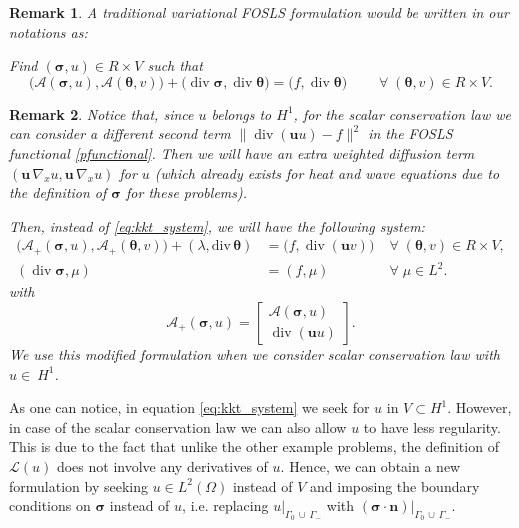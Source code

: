 \documentclass[a4paper,12pt]{amsart}
\numberwithin{equation}{section}
\newtheorem{remark}{Remark}[section]
\renewcommand{\div}{\operatorname{div}}
\def\bu{{\mathbf u}}
\def\bn{{\mathbf n}}
\newcommand{\A}{{\mathcal A}}
\def\btheta{{\boldsymbol \theta}}
\def\bsigma{{\boldsymbol \sigma}}
\newcommand{\om}{\Omega}
\begin{document}
\begin{remark}
A traditional variational FOSLS formulation would be written in our notations as:

Find $(\bsigma, u) \in R\times V$ such that 
\[
\big(\A(\bsigma, u ), \A(\btheta, v) \big) + \big( \div \bsigma, \div \btheta \big) = \big(f, \div \btheta\big) \qquad \;\forall\; (\btheta, v) \in R\times V.
\]
\end{remark}

\begin{remark}\label{rmk:complicate}
Notice that, since $u$ belongs to $H^1$, for the scalar conservation law we can consider a different second term $\| \div (\bu u) - f \|^2$ in the FOSLS functional \eqref{pfunctional}. Then we will have an extra weighted diffusion term $(\bu  \, \nabla_x u, \bu \, \nabla_x u)$ for $u$ (which already exists for heat and wave equations due to the definition of $\bsigma$ for these problems).

Then, instead of \eqref{eq:kkt_system}, we will have the following
 system:
\begin{equation}
\begin{array}{lll}
\big(\A_+(\bsigma, u), \A_+(\btheta, v) \big) + (\lambda, \mathrm{div}\,  \btheta) & = \big( f, \div (\bu v) \big)  & \;\forall\; (\btheta, v) \in R\times V,     \\
( \div  \bsigma,\mu )  &= (f, \mu) &  \;\forall\;  \mu\in L^2.
\end{array}
\label{eq:kkt_system_compl}
\end{equation} 
with
\begin{equation}
\A_+(\bsigma, u) = \begin{bmatrix} \A(\bsigma, u) \\ \div (\bu u) \end{bmatrix}.
\label{eq:Adefine}
\end{equation}
We use this modified formulation when we consider scalar conservation law with $u\in~H^1$.
\end{remark}

As one can notice, in equation \eqref{eq:kkt_system}  we seek for $u$ in $V \subset H^1$. However, in case of the scalar conservation law we can also allow $u$ to  have less regularity. This is due to the fact that unlike the other example problems,  the definition of $\mathcal{L}(u)$ does not involve any derivatives of $u$.  
%
Hence, we can obtain a new formulation by seeking $u  \in L^2(\om)$ instead of $V$ and imposing the boundary conditions on $\bsigma$ instead of $u$, i.e. replacing $u|_{\Gamma_0\,\cup\,\Gamma_-}$ with $(\bsigma\cdot\bn)|_{\Gamma_0\,\cup\,\Gamma_-}$. 
\end{document}

